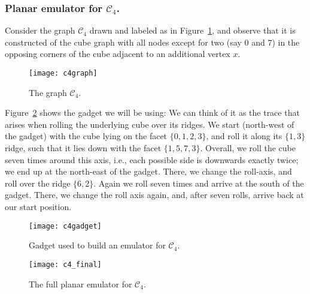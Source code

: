 \documentclass[envcountsect,envcountsame]{llncs}
\renewenvironment{accumulate}{}{}
\newcommand{\CC}{\ensuremath{\mathcal{C}_4}\xspace}
\begin{document}
\begin{accumulate}
\subsubsection{Planar emulator for \CC.}
Consider the graph \CC drawn and labeled as in Figure~\ref{fig:c4},
and observe that it is constructed of the cube graph with
all nodes except for two (say $0$ and $7$) in the opposing corners of the cube
adjacent to an additional vertex $x$.

\begin{figure}[htdp]
\centering\bigskip
\texttt{[image: c4graph]}
\caption{The graph \CC.\label{fig:c4}}
\end{figure}

Figure~\ref{fig:c4gadget} shows the gadget we will be using: We can think of it as the
trace that arises when rolling the underlying cube over its ridges.
We start (north-west of the gadget) with the cube lying on the facet 
$\{0,1,2,3\}$, and roll it along its $\{1,3\}$ ridge, such that it lies down
with the facet $\{1,5,7,3\}$. 
Overall, we roll the cube seven times around this axis,
i.e., each possible side is downwards exactly twice; we end up at the 
north-east of the gadget. There, we change the roll-axis,
and roll over the ridge $\{6,2\}$. Again we roll seven times and arrive at the 
south of the gadget. There, we change the roll axis again, and, after seven rolls, 
arrive back at our start position. 

\begin{figure}[tbp]
\centering
\texttt{[image: c4gadget]}
\caption{Gadget used to build an emulator for \CC.\label{fig:c4gadget}}
\end{figure}

\begin{figure}[htb]
\centering
\texttt{[image: c4\_final]}
\caption{The full planar emulator for \CC.\label{fig:c4emul}}
\end{figure}


\end{accumulate}
\end{document}
